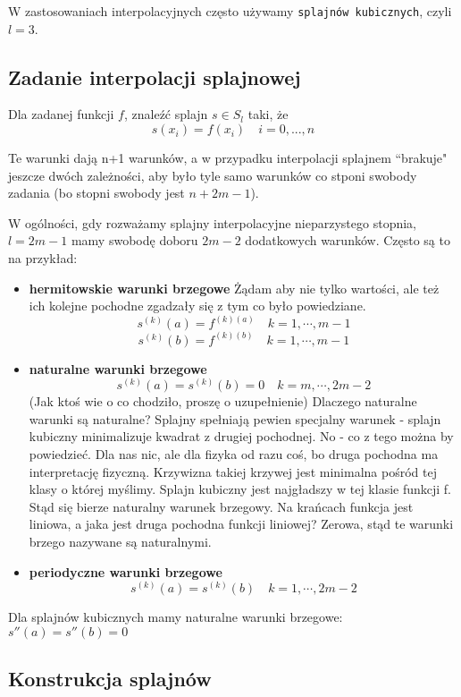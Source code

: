 \documentclass[hidelinks,a4paper,fleqn,oneside]{book}
\begin{document}
W zastosowaniach interpolacyjnych często używamy \texttt{splajnów kubicznych}, czyli $l=3$.

\subsection{Zadanie interpolacji splajnowej} Dla zadanej funkcji $f$, znaleźć splajn $s \in S_l$ taki, że \[s(x_i) = f(x_i)\quad i=0, ..., n\]

Te warunki dają n+1 warunków, a w przypadku interpolacji splajnem ``brakuje" jeszcze dwóch zależności, aby było tyle samo warunków co stponi swobody zadania (bo stopni swobody jest $n+2m-1$).

W ogólności, gdy rozważamy splajny interpolacyjne nieparzystego stopnia, $l=2m-1$ mamy swobodę doboru $2m-2$ dodatkowych warunków. Często są to na przykład:

\begin{itemize}
	\item \textbf{hermitowskie warunki brzegowe}
	Żądam aby nie tylko wartości, ale też ich kolejne pochodne zgadzały się z tym co było powiedziane.
	\[
		s^{(k)}(a) = f^{(k)(a)} \quad k = 1, \cdots, m-1
	\]
	\[
		s^{(k)}(b) = f^{(k)(b)} \quad k = 1, \cdots, m-1
	\]
	
	\item \textbf{naturalne warunki brzegowe}
	\[
		s^{(k)}(a) = s^{(k)}(b) = 0 \quad k = m, \cdots, 2m-2
	\]
	(Jak ktoś wie o co chodziło, proszę o uzupełnienie) Dlaczego naturalne warunki są naturalne? Splajny spełniają pewien specjalny warunek - splajn kubiczny minimalizuje kwadrat z drugiej pochodnej. No - co z tego można by powiedzieć. Dla nas nic, ale dla fizyka od razu coś, bo druga pochodna ma interpretację fizyczną. Krzywizna takiej krzywej jest minimalna pośród tej klasy o której myślimy. Splajn kubiczny jest najgładszy w tej klasie funkcji f. Stąd się bierze naturalny warunek brzegowy. Na krańcach funkcja jest liniowa, a jaka jest druga pochodna funkcji liniowej? Zerowa, stąd te warunki brzego nazywane są naturalnymi.
	
	\item \textbf{periodyczne warunki brzegowe}
	\[
		s^{(k)}(a) = s^{(k)}(b) \quad k=1, \cdots, 2m-2
	\]
\end{itemize}

Dla splajnów kubicznych mamy naturalne warunki brzegowe: $s''(a) = s''(b) = 0$

\subsection{Konstrukcja splajnów}
\end{document}
